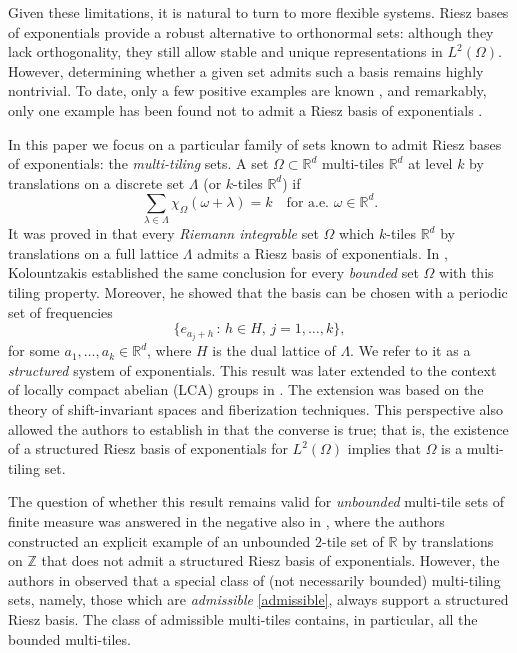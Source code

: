 \documentclass[a4paper,11pt]{amsart}
\theoremstyle{definition}
\theoremstyle{definition}
\def\w{\omega}
\def\Z{\mathbb{Z}}
\def\R{\mathbb{R}}
\begin{document}
	Given these limitations, it is natural to turn to more flexible systems. Riesz bases of exponentials provide a robust alternative to orthonormal sets: although they lack orthogonality, they still allow stable and unique representations in $L^2(\Omega)$. However, determining whether a given set admits such a basis remains highly nontrivial. To date, only a few positive examples are known \cite{Ma06,GL14, Kol, KN15, KN16, GL18, DL22}, and remarkably, only one example has been found not to admit a Riesz basis of exponentials \cite{KNO23}. 
	
	
	In this paper we focus on a particular family of sets known to admit Riesz bases of exponentials: the \textit{multi-tiling} sets. A set $\Omega\subset \R^d$ multi-tiles $\R^d$ at level $k$ by translations on a discrete set $\Lambda$ (or $k$-tiles $\R^d$) if $$\sum_{\lambda\in\Lambda}\chi_{\Omega}(\w+\lambda)=k\quad\text{for a.e. }\w\in\R^d.$$
	It was proved in \cite{GL18} that every \textit{Riemann integrable} set $\Omega$ which $k$-tiles $\R^d$ by translations on a full lattice $\Lambda$ admits a Riesz basis of exponentials. In  \cite{Kol},  Kolountzakis established the same conclusion for every \textit{bounded} set $\Omega$ with this tiling property. Moreover, he showed that the basis can be chosen with a periodic set of frequencies
	$$
	\{e_{a_j+h}\,:\,h\in H, \,j=1,\dots,k\},
	$$
	for some $a_1,\dots,a_k\in\R^d$, where $H$ is the dual lattice of $\Lambda$. We refer to it as  a {\it structured} system of exponentials. This result was later extended to the context of locally compact abelian (LCA) groups in \cite{AAC}. The extension was based on the theory of shift-invariant spaces and fiberization techniques. This perspective also allowed the authors to establish in \cite{AAC}  that the converse is true; that is, the existence of a structured Riesz basis of exponentials for $L^2(\Omega)$ implies that $\Omega$ is a multi-tiling set. 
	
	The question of whether this result remains valid for {\it unbounded} multi-tile sets of finite measure was answered  in the negative also in \cite{AAC}, where the authors constructed an explicit example of an unbounded $2$-tile set of $\R$ by translations on $\Z$ that does not admit a structured Riesz basis of exponentials. However, the authors in \cite{CC} observed that a special class of (not necessarily bounded) multi-tiling sets, namely, those which are \textit{admissible} \eqref{admissible}, always support a structured Riesz basis. The class of admissible multi-tiles contains, in particular, all the bounded multi-tiles. 
	
\end{document}
